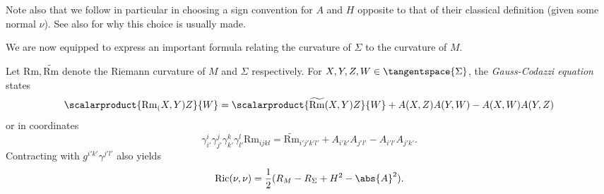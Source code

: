 \documentclass[titlepage,numbers=noenddot,oneside,%
cleardoublepage=empty,paper=a4,fontsize=11pt,%
english,%
]{scrartcl}
\newcommand{\Ricci}{\mathrm{Ric}} %
\newcommand{\riemanncurvature}{\mathrm{Rm}} %
\begin{document}
{\begin{remark}
    Note also that we follow in particular \textcite{almarazPositiveMassTheorem2016} in choosing a sign convention for \( A \) and \( H \) opposite to that of their classical definition (given some normal \( \nu \)). See also \cite[Remark 2.1]{leeGeometricRelativity2019} for why this choice is usually made.
\end{remark}
We are now equipped to express an important formula relating the curvature of \( \Sigma \) to the curvature of \( M \). 
\begin{lemma}
    Let \( \riemanncurvature,\widetilde{\riemanncurvature} \) denote the Riemann curvature of \( M \) and \( \Sigma \) respectively.
    For \( X,Y,Z,W \in \tangentspace{\Sigma}\), the \emph{Gauss-Codazzi equation} states
    \begin{equation}
        \scalarproduct{\riemanncurvature_(X,Y)Z}{W}=\scalarproduct{\widetilde{\riemanncurvature}(X,Y)Z}{W}+A(X,Z)A(Y,W)-A(X,W)A(Y,Z)\label{eq:gauss_codazzi}
    \end{equation}
    or in coordinates
    \begin{equation}
        \gamma^{i}_{i'}\gamma^j_{j'}\gamma^k_{k'}\gamma^l_{l'}\riemanncurvature_{ijkl}=\widetilde{\riemanncurvature}_{i'j'k'l'}+A_{i'k'}A_{j'l'}-A_{i'l'}A_{j'k'}\label{eq:gauss_codazzi_coordinates}.
    \end{equation}
    Contracting with \( g^{i'k'}\gamma^{j'l'} \) also yields
    \begin{equation}
        \Ricci(\nu,\nu)=\frac{1}{2}(R_M-R_{\Sigma}+H^2-\abs{A}^2). \label{eq:contracted_gauss_codazzi}
    \end{equation}
\end{lemma}

}
\end{document}
